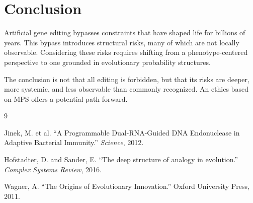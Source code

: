 \documentclass[11pt]{article}
\begin{document}
\section{Conclusion}

Artificial gene editing bypasses constraints that have shaped life for billions of years. This bypass introduces structural risks, many of which are not locally observable. Considering these risks requires shifting from a phenotype-centered perspective to one grounded in evolutionary probability structures.

The conclusion is not that all editing is forbidden, but that its risks are deeper, more systemic, and less observable than commonly recognized. An ethics based on MPS offers a potential path forward.


\begin{thebibliography}{9}

Jinek, M. et al. ``A Programmable Dual-RNA-Guided DNA Endonuclease in Adaptive Bacterial Immunity.'' \textit{Science}, 2012.

Hofstadter, D. and Sander, E. ``The deep structure of analogy in evolution.'' \textit{Complex Systems Review}, 2016.

Wagner, A. ``The Origins of Evolutionary Innovation.'' Oxford University Press, 2011.

\end{thebibliography}
\end{document}
